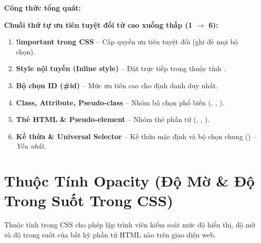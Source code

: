 \begin{conceptBox}
\sffamily
\textbf{Công thức tổng quát:} \quad {} \quad {} \quad {}
\par\vspace{8pt}
\textbf{Chuỗi thứ tự ưu tiên tuyệt đối từ cao xuống thấp (1 $\rightarrow$ 6):}
\par\vspace{6pt}
\begin{enumerate}[leftmargin=1.8em, itemsep=4pt, parsep=0pt]
    \item \textcolor{red!85!black}{\textbf{!important trong CSS}} -- Cấp quyền ưu tiên tuyệt đối (ghi đè mọi bộ chọn).
    \item \textcolor{orange!85!black}{\textbf{Style nội tuyến (Inline style) }} -- Đặt trực tiếp trong thuộc tính .
    \item \textcolor{primaryBlue}{\textbf{Bộ chọn ID (\#id) }} -- Mức ưu tiên cao cho định danh duy nhất.
    \item \textcolor{green!60!black}{\textbf{Class, Attribute, Pseudo-class }} -- Nhóm bộ chọn phổ biến (, \codeinline{[attr]}, ).
    \item \textcolor{gray!80!black}{\textbf{Thẻ HTML \& Pseudo-element }} -- Nhóm thẻ phần tử (, , ).
    \item \textcolor{gray!50!black}{\textbf{Kế thừa \& Universal Selector }} -- Kế thừa mặc định và bộ chọn chung (\codeinline{*}) -- \textit{Yếu nhất}.
\end{enumerate}
\end{conceptBox}


\section{Thuộc Tính Opacity (Độ Mờ \& Độ Trong Suốt Trong CSS)}
\label{sec:css_opacity_masterclass}

Thuộc tính  trong CSS cho phép lập trình viên kiểm soát mức độ hiển thị, độ mờ và độ trong suốt của bất kỳ phần tử HTML nào trên giao diện web.

